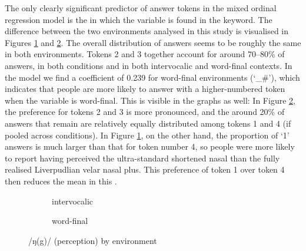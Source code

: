The only clearly significant predictor of answer tokens in the mixed ordinal regression model is the  in which the variable is found in the keyword.
The difference between the two environments analysed in this study is visualised in Figures \ref{fig.bar.ng.ext.intervoc} and \ref{fig.bar.ng.ext.wordfinal}.
The overall distribution of answers seems to be roughly the same in both environments.
Tokens 2 and 3 together account for around 70--80\% of answers, in both  conditions and in both intervocalic and word-final contexts.
In the model we find a coefficient of 0.239 for word-final environments (`\_\#'), which indicates that people are more likely to answer with a higher-numbered token when the variable is word-final.
This is visible in the graphs as well: In Figure \ref{fig.bar.ng.ext.wordfinal}, the preference for tokens 2 and 3 is more pronounced, and the around 20\% of answers that remain are relatively equally distributed among tokens 1 and 4 (if pooled across  conditions).
In Figure \ref{fig.bar.ng.ext.intervoc}, on the other hand, the proportion of `1' answers is much larger than that for token number 4, so people were more likely to report having perceived the ultra-standard shortened nasal than the fully realised Liverpudlian velar nasal plus.
This preference of token 1 over token 4 then reduces the mean in this .

\begin{figure}[h]
	\centering
	\begin{subfigure}{0.49\textwidth}
		\centering
			\resizebox{\linewidth}{!}{}
		\caption{intervocalic}
		\label{fig.bar.ng.ext.intervoc}
	\end{subfigure}
	\begin{subfigure}{0.49\textwidth}
		\centering
			\resizebox{\linewidth}{!}{} 
		\caption{word-final}
		\label{fig.bar.ng.ext.wordfinal}
	\end{subfigure}
	\caption{/ŋ(g)/ (perception) by environment}
	\label{fig.bar.ng.ext.environment}
\end{figure}

